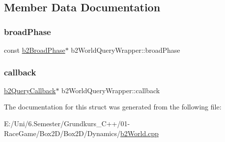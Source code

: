 \subsection{Member Data Documentation}
\mbox{\label{structb2_world_query_wrapper_ab85c542cfaf43d2ecf31fcbfd8c0c792}} 
\subsubsection{\texorpdfstring{broadPhase}{broadPhase}}
{\footnotesize\ttfamily const \mbox{\hyperlink{classb2_broad_phase}{b2\+Broad\+Phase}}$\ast$ b2\+World\+Query\+Wrapper\+::broad\+Phase}

\mbox{\label{structb2_world_query_wrapper_a3af9f06dfa228974fecabd2bb2b07d2e}} 
\subsubsection{\texorpdfstring{callback}{callback}}
{\footnotesize\ttfamily \mbox{\hyperlink{classb2_query_callback}{b2\+Query\+Callback}}$\ast$ b2\+World\+Query\+Wrapper\+::callback}



The documentation for this struct was generated from the following file\+:\begin{DoxyCompactItemize}
\item 
E\+:/\+Uni/6.\+Semester/\+Grundkurs\+\_\+\+C++/01-\/\+Race\+Game/\+Box2\+D/\+Box2\+D/\+Dynamics/\mbox{\hyperlink{b2_world_8cpp}{b2\+World.\+cpp}}\end{DoxyCompactItemize}
